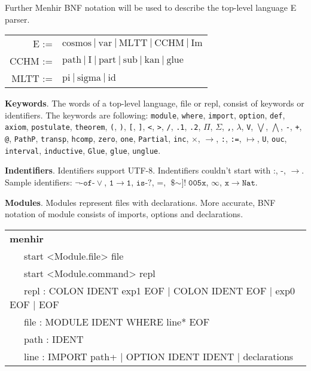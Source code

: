 \documentclass[a4paper,UKenglish,cleveref, autoref, thm-restate]{lipics-v2021}
\newcommand{\tabstyle}[0]{\scriptsize\ttfamily\fontseries{l}\selectfont}
\begin{document}
Further Menhir BNF notation will be used to describe the top-level language E parser.

\begin{table}[ht]
\centering
\begin{tabular}{rl}
      E :=&$\textrm{cosmos}\ |\ \textrm{var}\ |\ \textrm{MLTT}\ |\ \textrm{CCHM}\ |\ \textrm{Im}$ \\
   CCHM :=&$\textrm{path}\ |\ \textrm{I}\ |\ \textrm{part}\ |\ \textrm{sub}\ |\ \textrm{kan}\ |\ \textrm{glue}$ \\
   MLTT :=&$\textrm{pi}\ |\ \textrm{sigma}\ |\ \textrm{id}$ \\
\end{tabular}
\end{table}

\textbf{Keywords}. The words of a top-level language, file or repl, consist of keywords or identifiers.
The keywords are following: \texttt{module}, \texttt{where}, \texttt{import}, \texttt{option}, \texttt{def}, \texttt{axiom},
\texttt{postulate}, \texttt{theorem}, \texttt{(}, \texttt{)}, \texttt{[}, \texttt{]}, \texttt{<}, \texttt{>},
\texttt{/}, \texttt{.1}, \texttt{.2}, \texttt{$\Pi$}, \texttt{$\Sigma$}, \texttt{,}, \texttt{$\lambda$},
\texttt{V}, \texttt{$\bigvee$}, \texttt{$\bigwedge$}, \texttt{-}, \texttt{+}, \texttt{@}, \texttt{PathP},
\texttt{transp}, \texttt{hcomp}, \texttt{zero}, \texttt{one}, \texttt{Partial}, \texttt{inc},
\texttt{$\times$}, \texttt{$\rightarrow$}, \texttt{:}, \texttt{:=}, \texttt{$\mapsto$}, \texttt{U},
\texttt{ouc}, \texttt{interval}, \texttt{inductive}, \texttt{Glue}, \texttt{glue}, \texttt{unglue}.

\textbf{Indentifiers}. Identifiers support UTF-8. Indentifiers couldn't
start with $\texttt{:}$, $\texttt{-}$, $\rightarrow$. Sample identifiers:
$\neg\texttt{-of-}\vee$, $\texttt{1}$$\rightarrow$$\texttt{1}$, $\texttt{is-?}$,
$\texttt{=}$, $\texttt{\$$\sim$]!}$$\texttt{005x}$, $\infty$, $\texttt{x}$$\rightarrow$$\texttt{Nat}$.

\textbf{Modules}. Modules represent files with declarations. More accurate, BNF notation of module consists of imports, options and declarations.
\begin{table}[ht]
\tabstyle
\begin{tabular}{l}
\textbf{menhir} \\
\ \ \ start <Module.file> file \\
\ \ \ start <Module.command> repl \\
\ \ \ repl : COLON IDENT exp1 EOF | COLON IDENT EOF | exp0 EOF | EOF \\
\ \ \ file : MODULE IDENT WHERE line* EOF \\
\ \ \ path : IDENT \\
\ \ \ line : IMPORT path+ | OPTION IDENT IDENT | declarations \\
\end{tabular}
\end{table}
\end{document}
